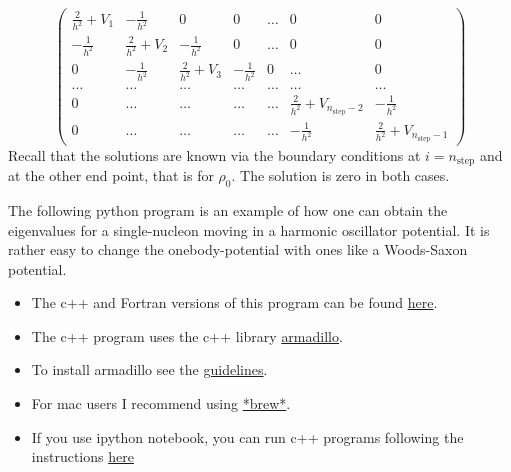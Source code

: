 \documentclass[%
oneside,                 %
final,                   %
10pt]{article}
\begin{document}
\begin{equation}
    \left( \begin{array}{ccccccc} \frac{2}{h^2}+V_1 & -\frac{1}{h^2} & 0   & 0    & \dots  &0     & 0 \\
                                -\frac{1}{h^2} & \frac{2}{h^2}+V_2 & -\frac{1}{h^2} & 0    & \dots  &0     &0 \\
                                0   & -\frac{1}{h^2} & \frac{2}{h^2}+V_3 & -\frac{1}{h^2}  &0       &\dots & 0\\
                                \dots  & \dots & \dots & \dots  &\dots      &\dots & \dots\\
                                0   & \dots & \dots & \dots  &\dots       &\frac{2}{h^2}+V_{n_{\mathrm{step}}-2} & -\frac{1}{h^2}\\
                                0   & \dots & \dots & \dots  &\dots       &-\frac{1}{h^2} & \frac{2}{h^2}+V_{n_{\mathrm{step}}-1}

             \end{array} \right)  
\label{eq:matrixse} 
\end{equation} 
Recall that the solutions are known via the boundary conditions at
$i=n_{\mathrm{step}}$ and at the other end point, that is for  $\rho_0$.
The solution is zero in both cases.



The following python program is an example of how one can obtain the eigenvalues for a single-nucleon moving in a harmonic oscillator potential. It is rather easy to change the onebody-potential with ones like a Woods-Saxon potential. 


\begin{itemize}
\item The c++ and Fortran versions of this program can be found \href{{https://github.com/NuclearStructure/PHY981/tree/master/doc/pub/spdata/programs}}{here}. 

\item The c++  program uses the c++ library \href{{http://arma.sourceforge.net/}}{armadillo}. 

\item To install armadillo see the \href{{http://www.uio.no/studier/emner/matnat/fys/FYS4411/v14/guides/installing-armadillo/}}{guidelines}. 

\item For mac users I recommend using \href{{http://brew.sh/}}{*brew*}.

\item If you use ipython notebook, you can run c++ programs following the instructions \href{{http://nbviewer.ipython.org/github/dragly/cppmagic/blob/master/example.ipynb}}{here}
\end{itemize}
\end{document}
